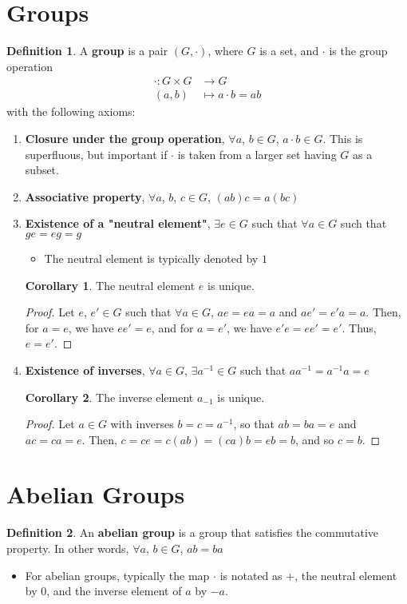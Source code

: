 \documentclass[letterpaper,12pt]{article}
\theoremstyle{definition}
\newtheorem*{definition}{Definition}
\newtheorem*{corollary}{Corollary}
\begin{document}
\section*{Groups}
\begin{definition}
A \textbf{group} is a pair $(G, \cdot)$, where $G$ is a set, and $\cdot$ is the group operation
\begin{align*}
    \cdot : G \times G & \longrightarrow G \\
    (a,b) & \longmapsto a \cdot b = ab
\end{align*}
with the following axioms:
\begin{enumerate}
    \item \textbf{Closure under the group operation}, $\forall a$, $b \in G$, $a \cdot b \in G$. This is superfluous, but important if $\cdot$ is taken from a larger set having $G$ as a subset.
    \item \textbf{Associative property}, $\forall a$, $b$, $c \in G$, $(ab)c = a(bc)$
    \item \textbf{Existence of a "neutral element"}, $\exists e \in G$ such that $\forall a \in G$ such that $ge = eg = g$
    \begin{itemize}
        \item The neutral element is typically denoted by $1$
    \end{itemize}
    \begin{corollary}
    The neutral element $e$ is unique.
    \end{corollary}
    \begin{proof}
    Let $e$, $e' \in G$ such that $\forall a \in G$, $ae = ea = a$ and $ae' = e'a = a$. Then, for $a = e$, we have $ee' = e$, and for $a = e'$, we have $e'e = ee' = e'$. Thus, $e = e'$.
    \end{proof}
    \item \textbf{Existence of inverses}, $\forall a \in G$, $\exists a^{-1} \in G$ such that $aa^{-1} = a^{-1}a = e$
    \begin{corollary}
    The inverse element $a_{-1}$ is unique.
    \end{corollary}
    \begin{proof}
    Let $a \in G$ with inverses $b = c = a^{-1}$, so that $ab = ba = e$ and $ac = ca = e$. Then, $c = ce = c(ab) = (ca)b = eb = b$, and so $c = b$.
    \end{proof}
\end{enumerate}
\end{definition}

\section*{Abelian Groups}
\begin{definition}
An \textbf{abelian group} is a group that satisfies the commutative property. In other words, $\forall a$, $b \in G$, $ab = ba$
\begin{itemize}
    \item For abelian groups, typically the map $\cdot$ is notated as $+$, the neutral element by $0$, and the inverse element of $a$ by $-a$.
\end{itemize}
\end{definition}
\end{document}
